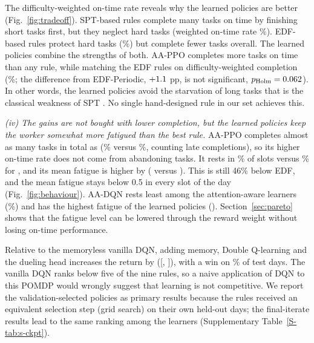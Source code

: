 The difficulty-weighted on-time rate reveals why the learned policies are better (Fig.~\ref{fig:tradeoff}). SPT-based rules complete many tasks on time by finishing short tasks first, but they neglect hard tasks (weighted on-time rate \SPTThresholdWOnTimePct\%). EDF-based rules protect hard tasks (\EDFPeriodicWOnTimePct\%) but complete fewer tasks overall. The learned policies combine the strengths of both. AA-PPO completes more tasks on time than any rule, while matching the EDF rules on difficulty-weighted completion (\PPOWOnTimePct\%; the difference from EDF-Periodic, $+1.1$ pp, is not significant, $p_{\mathrm{Holm}}=0.062$). In other words, the learned policies avoid the starvation of long tasks that is the classical weakness of SPT \cite{pinedo2016}. No single hand-designed rule in our set achieves this.

\emph{(iv) The gains are not bought with lower completion, but the learned policies keep the worker somewhat more fatigued than the best rule.} AA-PPO completes almost as many tasks in total as \bestHeur{} (\PPOComplPct\% versus \SPTThresholdComplPct\%, counting late completions), so its higher on-time rate does not come from abandoning tasks. It rests in \PPOBreakPct\% of slots versus \bestHeurBreakPct\% for \bestHeur, and its mean fatigue is higher by \PpoFatSPTThreshold{} (\PPOFatigue{} versus \bestHeurFatigue). This is still 46\% below EDF, and the mean fatigue stays below 0.5 in every slot of the day (Fig.~\ref{fig:behaviour}). AA-DQN rests least among the attention-aware learners (\AADQNBreakPct\%) and has the highest fatigue of the learned policies (\aaFatigue). Section~\ref{sec:pareto} shows that the fatigue level can be lowered through the reward weight without losing on-time performance.

Relative to the memoryless vanilla DQN, adding memory, Double Q-learning and the dueling head increases the return by \dRetVsDqn{} ([\dRetVsDqnLo, \dRetVsDqnHi]), with a win on \winRetVsDqnPct\% of test days. The vanilla DQN ranks below five of the nine rules, so a naive application of DQN to this POMDP would wrongly suggest that learning is not competitive. We report the validation-selected policies as primary results because the rules received an equivalent selection step (grid search) on their own held-out days; the final-iterate results lead to the same ranking among the learners (Supplementary Table~\ref{S-tab:s-ckpt}).

\begin{table}[!htbp]
\centering
\caption{Performance on 500 held-out test days (nominal environment). Learned policies: mean $\pm$ s.d.\ across ten training seeds of the per-seed test means. Rules: mean $\pm$ s.d.\ across test days (they are deterministic given the day). Bold marks the best value in each column.}
\label{tab:main}
\small
\setlength{\tabcolsep}{3pt}
\resizebox{\textwidth}{!}{}
\end{table}

